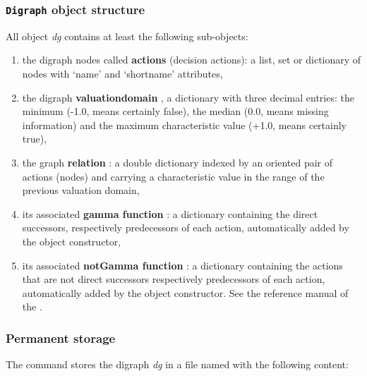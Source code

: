 \documentclass[letterpaper,10pt,english]{sphinxmanual}
\begin{document}
\subsubsection{\texttt{Digraph} object structure}
\label{tutorial:digraph-object-structure}
All {\hyperref[techDoc:digraphs.Digraph]{\emph{}}} object \emph{dg} contains at least the following sub-objects:
\begin{enumerate}
\item {} 
the digraph nodes called \textbf{actions} (decision actions): a list, set or dictionary of nodes with `name' and `shortname' attributes,

\item {} 
the digraph \textbf{valuationdomain} , a dictionary with three decimal entries: the minimum (-1.0, means certainly false), the median (0.0, means missing information) and the maximum characteristic value (+1.0, means certainly true),

\item {} 
the graph \textbf{relation} : a double dictionary indexed by an oriented pair of actions (nodes) and carrying a characteristic value in the range of the previous valuation domain,

\item {} 
its associated \textbf{gamma function} : a dictionary containing the direct successors, respectively predecessors of each action, automatically added by the object constructor,

\item {} 
its associated \textbf{notGamma function} : a dictionary containing the actions that are not direct successors respectively predecessors of each action, automatically added by the object constructor. See the reference manual of the {\hyperref[techDoc:digraphs-label]{\emph{}}}.

\end{enumerate}


\subsubsection{Permanent storage}
\label{tutorial:permanent-storage}
The  command stores the digraph \emph{dg} in a file named  with the following content:
\end{document}
